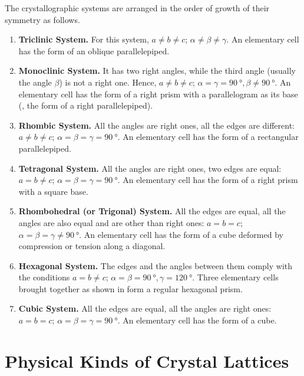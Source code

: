 The crystallographic systems are arranged in the order of growth of their symmetry as follows.
\begin{enumerate}[1.]
	\item \textbf{Triclinic System.} For this system, $a\neq b\neq c$; $\alpha\neq\beta\neq\gamma$. An elementary cell has the form of an oblique parallelepiped.

	\item \textbf{Monoclinic System.} It has two right angles, while the third angle (usually the angle $\beta$) is not a right one. Hence, $a\neq b\neq c$; $\alpha=\gamma=\SI{90}{\degree}, \beta\neq\SI{90}{\degree}$. An elementary cell has the form of a right prism with a parallelogram as its base (\ie, the form of a right parallelepiped).

	\item \textbf{Rhombic System.} All the angles are right ones, all the edges are different: $a\neq b\neq c$; $\alpha=\beta=\gamma=\SI{90}{\degree}$. An elementary cell has the form of a rectangular parallelepiped.

	\item \textbf{Tetragonal System.} All the angles are right ones, two edges are equal: $a=b\neq c$; $\alpha=\beta=\gamma=\SI{90}{\degree}$. An elementary cell has the form of a right prism with a square base.

	\item \textbf{Rhombohedral (or Trigonal) System.} All the edges are equal, all the angles are also equal and are other than right ones: $a=b=c$; $\alpha=\beta=\gamma\neq\SI{90}{\degree}$. An elementary cell has the form of a cube deformed by compression or tension along a diagonal.

	\item \textbf{Hexagonal System.} The edges and the angles between them comply with the conditions $a=b\neq c$; $\alpha=\beta=\SI{90}{\degree}, \gamma=\SI{120}{\degree}$. 	Three elementary cells brought together as shown in  form a regular hexagonal prism.

	\item \textbf{Cubic System.} All the edges are equal, all the angles are right ones: $a=b=c$; $\alpha=\beta=\gamma=\SI{90}{\degree}$. An elementary cell has the form of a cube.
\end{enumerate}

\section{Physical Kinds of Crystal Lattices}\label{sec:13_3}

